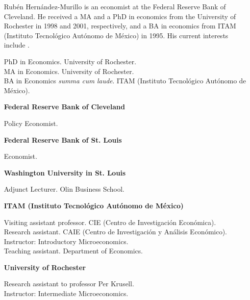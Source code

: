 \documentclass{xetexCV}
\begin{document}
\makecvtitle


Rub\'{e}n Hern\'{a}ndez-Murillo is an economist at the Federal Reserve Bank of Cleveland. He received a MA and a PhD in economics from the University of Rochester in 1998 and 2001, respectively, and a BA in economics from ITAM (Instituto Tecnol\'{o}gico Aut\'{o}nomo de M\'{e}xico) in 1995. His current interests include .

PhD in Economics. University of Rochester.  \\
MA in Economics. University of Rochester.  \\
BA in Economics \emph{summa cum laude}. ITAM (Instituto Tecnol\'{o}gico Aut\'{o}nomo de M\'{e}xico).  \\


\begin{flushleft}
\textbf{Federal Reserve Bank of Cleveland}
\end{flushleft} 
Policy Economist.   \\
\begin{flushleft}
\textbf{Federal Reserve Bank of St. Louis}
\end{flushleft} 
Economist.   \\
\begin{flushleft}
\textbf{Washington University in St. Louis}
\end{flushleft} 
Adjunct Lecturer. Olin Business School.  \\
\begin{flushleft}
\textbf{ITAM (Instituto Tecnol\'{o}gico Aut\'{o}nomo de M\'{e}xico)} 
\end{flushleft} 
Visiting assistant professor. CIE (Centro de Investigaci\'{o}n Econ\'{o}mica).   \\
Research assistant. CAIE (Centro de Investigaci\'{o}n y An\'{a}lisis Econ\'{o}mico).   \\
Instructor: Introductory Microeconomics.  \\
Teaching assistant. Department of Economics.  
\begin{flushleft} 
\textbf{University of Rochester} 
\end{flushleft} 
Research assistant to professor Per Krusell.  \\
Instructor: Intermediate Microeconomics.  
\end{document}
